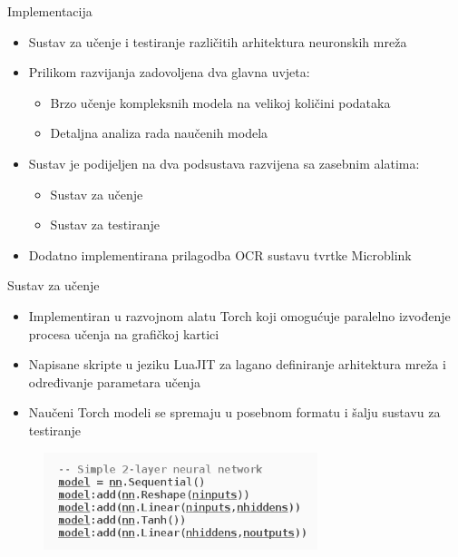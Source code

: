 \documentclass[pdf]{beamer}
\begin{document}
\begin{frame}{Implementacija}

\begin{itemize}
\setlength\itemsep{0.5em}

	\item Sustav za učenje i testiranje različitih arhitektura neuronskih mreža

	\item Prilikom razvijanja zadovoljena dva glavna uvjeta: 
	\begin{itemize}
 		\item Brzo učenje kompleksnih modela na velikoj količini podataka
 		\item Detaljna analiza rada naučenih modela
	\end{itemize}
	
	\item Sustav je podijeljen na dva podsustava razvijena sa zasebnim alatima:
	\begin{itemize}
 		\item Sustav za učenje
 		\item Sustav za testiranje
	\end{itemize}
	
	\item Dodatno implementirana prilagodba OCR sustavu tvrtke Microblink
	
\end{itemize}



\end{frame}


\begin{frame}{Sustav za učenje}

\begin{itemize}
\setlength\itemsep{0.5em}

	\item Implementiran u razvojnom alatu Torch koji omogućuje paralelno izvođenje procesa učenja na grafičkoj kartici
	
	\item Napisane skripte u jeziku LuaJIT za lagano definiranje arhitektura mreža i određivanje parametara učenja
	
	\item Naučeni Torch modeli se spremaju u posebnom formatu i šalju sustavu za testiranje
	
\end{itemize}

\begin{figure}
\centering
\includegraphics[width=8cm]{slike/nn_model.png}
\end{figure}

\end{frame}
\end{document}
